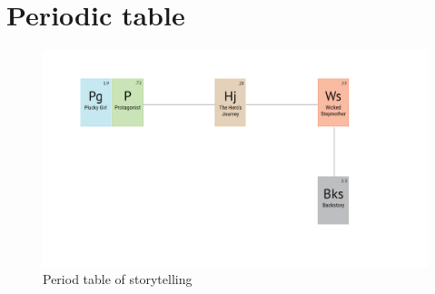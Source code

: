 \section{Periodic table}
\begin{figure}[H]
  \centering
  \includegraphics[width=18cm]{Images/periodicTable}
  \caption{Period table of storytelling}
\end{figure}
